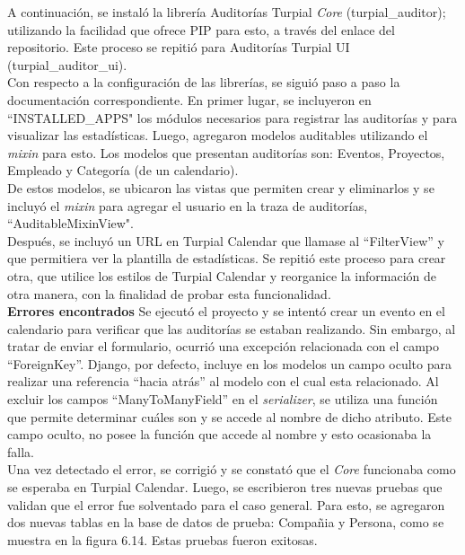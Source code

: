 A continuación, se instaló la librería Auditorías Turpial \textit{Core} (turpial\_auditor); utilizando la facilidad que ofrece PIP para esto, a través del enlace del repositorio. Este proceso se repitió para Auditorías Turpial UI (turpial\_auditor\_ui).\\

Con respecto a la configuración de las librerías, se siguió paso a paso la documentación correspondiente. En primer lugar, se incluyeron en “INSTALLED\_APPS" los módulos necesarios para registrar las auditorías y para visualizar las estadísticas. Luego, agregaron modelos auditables utilizando el \textit{mixin} para esto. Los modelos que presentan auditorías son: Eventos, Proyectos, Empleado y Categoría (de un calendario).\\

De estos modelos, se ubicaron las vistas que permiten crear y eliminarlos y se incluyó el \textit{mixin} para agregar el usuario en la traza de auditorías, “AuditableMixinView".\\

Después, se incluyó un URL en Turpial Calendar que llamase al “FilterView” y que permitiera ver la plantilla de estadísticas. Se repitió este proceso para crear otra, que utilice los estilos de Turpial Calendar y reorganice la información de otra manera, con la finalidad de probar esta funcionalidad.\\

\textbf{Errores encontrados}  Se ejecutó el proyecto y se intentó crear un evento en el calendario para verificar que las auditorías se estaban realizando. Sin embargo, al tratar de enviar el formulario, ocurrió una excepción relacionada con el campo “ForeignKey”. Django, por defecto, incluye en los modelos un campo oculto para realizar una referencia “hacia atrás” al modelo con el cual esta relacionado. Al excluir los campos “ManyToManyField” en el \textit{serializer}, se utiliza una función que permite determinar cuáles son y se accede al nombre de dicho atributo. Este campo oculto, no posee la función que accede al nombre y esto ocasionaba la falla.\\

Una vez detectado el error, se corrigió y se constató que el \textit{Core} funcionaba como se esperaba en Turpial Calendar. Luego, se escribieron tres nuevas pruebas que validan que el error fue solventado para el caso general. Para esto, se agregaron dos nuevas tablas en la base de datos de prueba: Compañia y Persona, como se muestra en la figura 6.14. Estas pruebas fueron exitosas.\\

